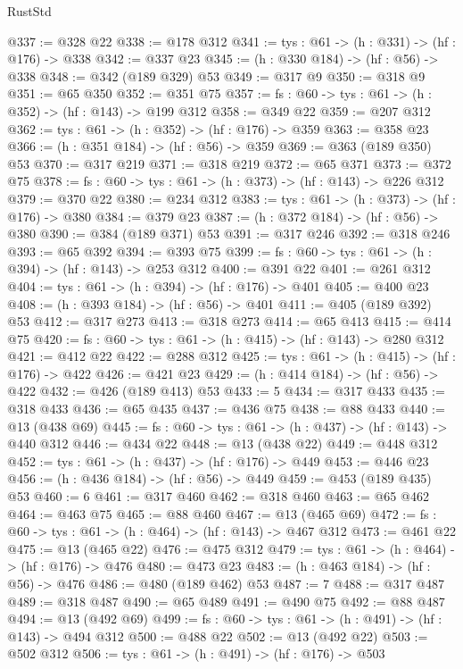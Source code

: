 \begin{lexlean}{RustStd}
\begin{coremodule}
@337 := @328 @22
@338 := @178 @312
@341 := {tys : @61} -> (h : @331) -> (hf : @176) -> @338
@342 := @337 @23
@345 := (h : @330 @184) -> (hf : @56) -> @338
@348 := @342 (@189 @329) @53
@349 := @317 @9
@350 := @318 @9
@351 := @65 @350
@352 := @351 @75
@357 := {fs : @60} -> {tys : @61} -> (h : @352) -> (hf : @143) -> @199 @312
@358 := @349 @22
@359 := @207 @312
@362 := {tys : @61} -> (h : @352) -> (hf : @176) -> @359
@363 := @358 @23
@366 := (h : @351 @184) -> (hf : @56) -> @359
@369 := @363 (@189 @350) @53
@370 := @317 @219
@371 := @318 @219
@372 := @65 @371
@373 := @372 @75
@378 := {fs : @60} -> {tys : @61} -> (h : @373) -> (hf : @143) -> @226 @312
@379 := @370 @22
@380 := @234 @312
@383 := {tys : @61} -> (h : @373) -> (hf : @176) -> @380
@384 := @379 @23
@387 := (h : @372 @184) -> (hf : @56) -> @380
@390 := @384 (@189 @371) @53
@391 := @317 @246
@392 := @318 @246
@393 := @65 @392
@394 := @393 @75
@399 := {fs : @60} -> {tys : @61} -> (h : @394) -> (hf : @143) -> @253 @312
@400 := @391 @22
@401 := @261 @312
@404 := {tys : @61} -> (h : @394) -> (hf : @176) -> @401
@405 := @400 @23
@408 := (h : @393 @184) -> (hf : @56) -> @401
@411 := @405 (@189 @392) @53
@412 := @317 @273
@413 := @318 @273
@414 := @65 @413
@415 := @414 @75
@420 := {fs : @60} -> {tys : @61} -> (h : @415) -> (hf : @143) -> @280 @312
@421 := @412 @22
@422 := @288 @312
@425 := {tys : @61} -> (h : @415) -> (hf : @176) -> @422
@426 := @421 @23
@429 := (h : @414 @184) -> (hf : @56) -> @422
@432 := @426 (@189 @413) @53
@433 := 5
@434 := @317 @433
@435 := @318 @433
@436 := @65 @435
@437 := @436 @75
@438 := @88 @433
@440 := @13 (@438 @69)
@445 := {fs : @60} -> {tys : @61} -> (h : @437) -> (hf : @143) -> @440 @312
@446 := @434 @22
@448 := @13 (@438 @22)
@449 := @448 @312
@452 := {tys : @61} -> (h : @437) -> (hf : @176) -> @449
@453 := @446 @23
@456 := (h : @436 @184) -> (hf : @56) -> @449
@459 := @453 (@189 @435) @53
@460 := 6
@461 := @317 @460
@462 := @318 @460
@463 := @65 @462
@464 := @463 @75
@465 := @88 @460
@467 := @13 (@465 @69)
@472 := {fs : @60} -> {tys : @61} -> (h : @464) -> (hf : @143) -> @467 @312
@473 := @461 @22
@475 := @13 (@465 @22)
@476 := @475 @312
@479 := {tys : @61} -> (h : @464) -> (hf : @176) -> @476
@480 := @473 @23
@483 := (h : @463 @184) -> (hf : @56) -> @476
@486 := @480 (@189 @462) @53
@487 := 7
@488 := @317 @487
@489 := @318 @487
@490 := @65 @489
@491 := @490 @75
@492 := @88 @487
@494 := @13 (@492 @69)
@499 := {fs : @60} -> {tys : @61} -> (h : @491) -> (hf : @143) -> @494 @312
@500 := @488 @22
@502 := @13 (@492 @22)
@503 := @502 @312
@506 := {tys : @61} -> (h : @491) -> (hf : @176) -> @503

\end{coremodule}
\end{lexlean}

